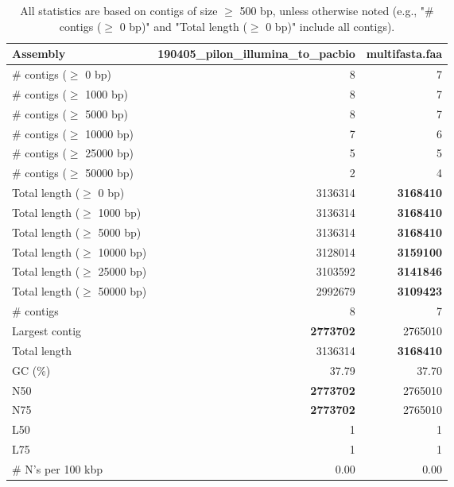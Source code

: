 \documentclass[12pt,a4paper]{article}
\begin{document}
\begin{table}[ht]
\begin{center}
\caption{All statistics are based on contigs of size $\geq$ 500 bp, unless otherwise noted (e.g., "\# contigs ($\geq$ 0 bp)" and "Total length ($\geq$ 0 bp)" include all contigs).}
\begin{tabular}{|l*{2}{|r}|}
\hline
Assembly & 190405\_pilon\_illumina\_to\_pacbio & multifasta.faa \\ \hline
\# contigs ($\geq$ 0 bp) & 8 & 7 \\ \hline
\# contigs ($\geq$ 1000 bp) & 8 & 7 \\ \hline
\# contigs ($\geq$ 5000 bp) & 8 & 7 \\ \hline
\# contigs ($\geq$ 10000 bp) & 7 & 6 \\ \hline
\# contigs ($\geq$ 25000 bp) & 5 & 5 \\ \hline
\# contigs ($\geq$ 50000 bp) & 2 & 4 \\ \hline
Total length ($\geq$ 0 bp) & 3136314 & {\bf 3168410} \\ \hline
Total length ($\geq$ 1000 bp) & 3136314 & {\bf 3168410} \\ \hline
Total length ($\geq$ 5000 bp) & 3136314 & {\bf 3168410} \\ \hline
Total length ($\geq$ 10000 bp) & 3128014 & {\bf 3159100} \\ \hline
Total length ($\geq$ 25000 bp) & 3103592 & {\bf 3141846} \\ \hline
Total length ($\geq$ 50000 bp) & 2992679 & {\bf 3109423} \\ \hline
\# contigs & 8 & 7 \\ \hline
Largest contig & {\bf 2773702} & 2765010 \\ \hline
Total length & 3136314 & {\bf 3168410} \\ \hline
GC (\%) & 37.79 & 37.70 \\ \hline
N50 & {\bf 2773702} & 2765010 \\ \hline
N75 & {\bf 2773702} & 2765010 \\ \hline
L50 & 1 & 1 \\ \hline
L75 & 1 & 1 \\ \hline
\# N's per 100 kbp & 0.00 & 0.00 \\ \hline
\end{tabular}
\end{center}
\end{table}
\end{document}

